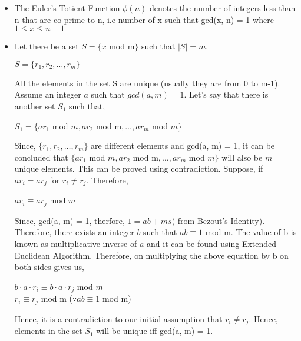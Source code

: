 \documentclass[11pt]{article}
\begin{document}
\begin{itemize}
    \item The Euler's Totient Function $\phi(n)$ denotes the number of integers less than n that are co-prime to n, i.e number of x such that gcd(x, n) = 1 where $1 \leq x \leq n-1$
    \item Let there be a set $S = \{x$ mod m$\}$ such that $|S| = m$.
    \begin{center}
        $S = \{r_1, r_2,\hdots, r_m\}$
    \end{center}
    All the elements in the set S are unique (usually they are from 0 to m-1). Assume an integer $a$ such that $gcd(a, m) = 1$. Let's say that there is another set $S_1$ such that,
    \begin{center}
        $S_1 = \{ar_1$ mod $m, ar_2$ mod m$,\hdots, ar_m$ mod $m\}$
    \end{center}
    Since, $\{r_1, r_2,\hdots, r_m\}$ are different elements and gcd(a, m) = 1, it can be concluded that $\{ar_1$ mod $m, ar_2$ mod m$,\hdots, ar_m$ mod $m\}$ will also be $m$ unique elements. This can be proved using contradiction. Suppose, if $ar_i = ar_j$ for $r_i \neq r_j$. Therefore,
    \begin{center}
        $ar_i \equiv ar_j$ mod $m$
    \end{center}
    Since, gcd(a, m) = 1, therfore, $1 = ab + ms$( from Bezout's Identity). Therefore, there exists an integer $b$ such that $ab \equiv 1$ mod m. The value of b is known as multiplicative inverse of $a$ and it can be found using Extended Euclidean Algorithm.
    Therefore, on multiplying the above equation by b on both sides gives us,
    \begin{center}
        $b\cdot a\cdot r_i \equiv b\cdot a \cdot r_j$ mod $m$\\
        \vspace{3mm}
        $r_i \equiv r_j$ mod m    ($\because ab \equiv 1$ mod m)
    \end{center}
    Hence, it is a contradiction to our initial assumption that $r_i \neq r_j$. Hence, elements in the set $S_1$ will be unique iff gcd(a, m) = 1.

\end{itemize}
\end{document}

